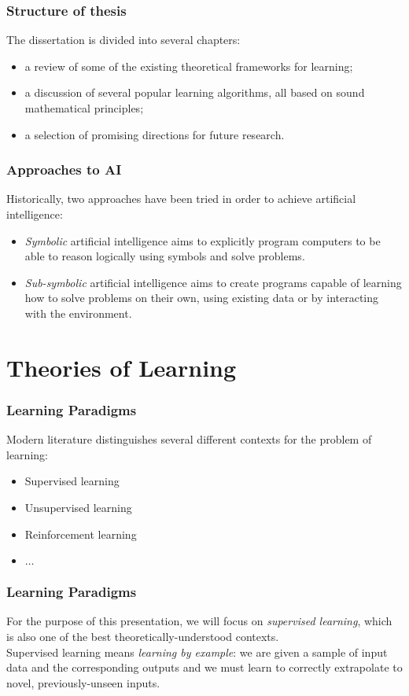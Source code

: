 \documentclass{beamer}
\theoremstyle{definition}
\begin{document}
\begin{frame}
\frametitle{Structure of thesis}

The dissertation is divided into several chapters:
\begin{itemize}
    \item a review of some of the existing theoretical frameworks for learning;
    \item a discussion of several popular learning algorithms, all based on sound mathematical principles;
    \item a selection of promising directions for future research.
\end{itemize}
\end{frame}

\begin{frame}
\frametitle{Approaches to AI}

Historically, two approaches have been tried in order to achieve artificial intelligence:
\begin{itemize}
    \item \emph{Symbolic} artificial intelligence aims to explicitly program computers to be able to reason logically using symbols and solve problems.
    \item \emph{Sub-symbolic} artificial intelligence aims to create programs capable of learning how to solve problems on their own, using existing data or by interacting with the environment.
\end{itemize}
\end{frame}

\section{Theories of Learning}

\begin{frame}
\frametitle{Learning Paradigms}

Modern literature distinguishes several different contexts for the problem of learning:
\begin{itemize}
    \item Supervised learning
    \item Unsupervised learning
    \item Reinforcement learning
    \item \(\dots\)
\end{itemize}
\end{frame}

\begin{frame}
\frametitle{Learning Paradigms}

For the purpose of this presentation, we will focus on \emph{supervised learning}, which is also one of the best theoretically-understood contexts.\\[1em]

Supervised learning means \emph{learning by example}: we are given a sample of input data and the corresponding outputs and we must learn to correctly extrapolate to novel, previously-unseen inputs.    
\end{frame}
\end{document}
